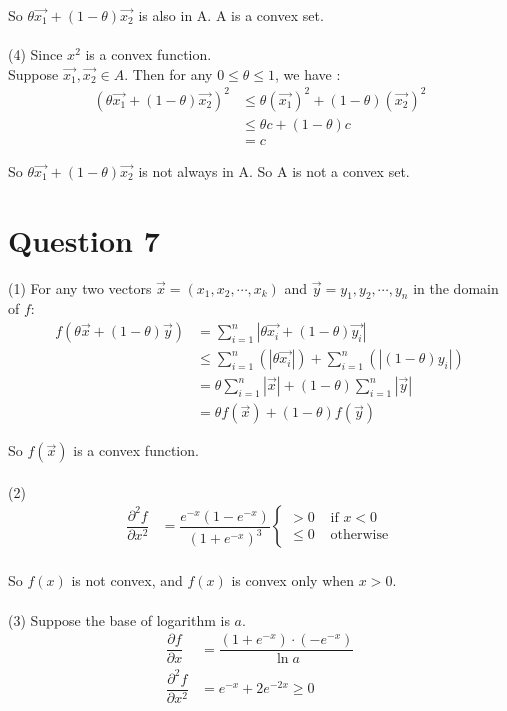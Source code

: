 \documentclass{amsart}
\begin{document}
So $\theta\vec{x_1} + (1-\theta)\vec{x_2}$ is also in A. 
A is a convex set.
\\\\
\noindent(4)
Since $x^2$ is a convex function.\\
Suppose $\vec{x_1}, \vec{x_2} \in A$. Then for any $0\le \theta \le 1$, we have :
\begin{align*}
	(\theta\vec{x_1} + (1-\theta)\vec{x_2})^2 &\le \theta (\vec{x_1})^2 + (1-\theta) (\vec{x_2})^2\\
	&\le \theta c + (1-\theta) c\\
	&= c
\end{align*}

So $\theta\vec{x_1} + (1-\theta)\vec{x_2}$ is not always in A. So A is not a convex set.
\\

\section{Question 7} 

\noindent (1)
For any two vectors $\vec{x}=(x_1, x_2,\cdots,x_k)$ and $\vec{y}={y_1, y_2,\cdots,y_n}$ in the domain of $f$:
\begin{align*}
	f(\theta \vec{x} + (1-\theta)\vec{y}) &= \sum\limits_{i=1}^{n}|\theta\vec{x_i} + (1-\theta)\vec{y_i}| \\
	&\le \sum\limits_{i=1}^{n}(|\theta \vec{x_i}|) + \sum\limits_{i=1}^{n}(|(1-\theta)y_i|)\\
	&= \theta \sum\limits_{i=1}^{n}|\vec{x}| + (1-\theta) \sum\limits_{i=1}^{n}|\vec{y}|\\
	&= \theta f(\vec{x}) + (1-\theta)f(\vec{y})
\end{align*}

So $f(\vec{x})$ is a convex function.
\\\\
(2)
\begin{align*}
	\dfrac{\partial^2 f}{\partial x^2} &= \dfrac{e^{-x}(1-e^{-x})}{(1+e^{-x})^3}\begin{cases}
		>0 & \text{ if }x<0\\
		\le0 & \text{ otherwise}
	\end{cases}\\
\end{align*}

So $f(x)$ is not convex, and $f(x)$ is convex only when $x>0$.
\\\\
(3)
Suppose the base of logarithm is $a$.
\begin{align*}
	\dfrac{\partial f}{\partial x} &= \dfrac{(1+e^{-x})\cdot(-e^{-x})}{\ln a}
	\\
	\dfrac{\partial^2 f}{\partial x^2} &= e^{-x} + 2e^{-2x} \ge 0
\end{align*}
\end{document}
